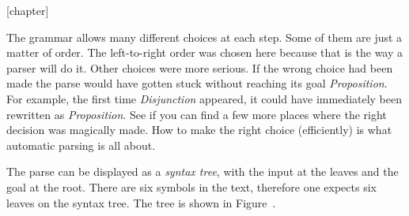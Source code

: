 [chapter]
\setcounter{SyntaxTree}{\value{figure}}

\noindent
The grammar allows many different choices at each step.  
Some of them are just a matter of order.
The left-to-right order was chosen here because that is the way a parser
will do it.
Other choices were more serious. 
If the wrong choice had been made the parse would have gotten stuck
without reaching its goal {\em Proposition}.
For example, the first time {\em Disjunction} appeared, it could
have immediately been rewritten as {\em Proposition}.  
See if you can find a few more places where the right decision was
magically made.
How to make the right choice (efficiently) is what automatic 
parsing is all about.  

The parse can be displayed as a {\em syntax tree}, 
with the input at the leaves and the goal at the root.
There are six
symbols in the text, therefore one expects six leaves on the
syntax tree.  The tree is shown in Figure~\theSyntaxTree.

